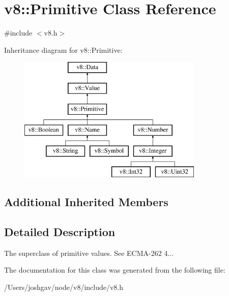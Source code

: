 \hypertarget{classv8_1_1_primitive}{}\section{v8\+:\+:Primitive Class Reference}
\label{classv8_1_1_primitive}


{\ttfamily \#include $<$v8.\+h$>$}

Inheritance diagram for v8\+:\+:Primitive\+:\begin{figure}[H]
\begin{center}
\leavevmode
\includegraphics[height=6.000000cm]{classv8_1_1_primitive}
\end{center}
\end{figure}
\subsection*{Additional Inherited Members}


\subsection{Detailed Description}
The superclass of primitive values. See E\+C\+M\+A-\/262 4... 

The documentation for this class was generated from the following file\+:\begin{DoxyCompactItemize}
\item 
/\+Users/joshgav/node/v8/include/v8.\+h\end{DoxyCompactItemize}
